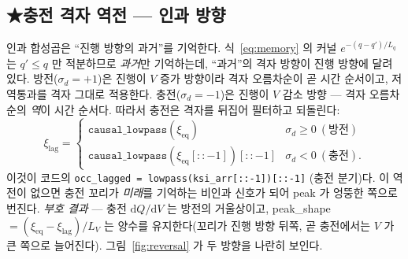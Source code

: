 \documentclass[11pt,a4paper]{article}
\newcommand{\dd}{\mathrm{d}}
\newcommand{\eq}{\mathrm{eq}}
\newcommand{\code}[1]{\texttt{#1}}
\begin{document}
\subsection{★충전 격자 역전 — 인과 방향}
인과 합성곱은 ``진행 방향의 과거''를 기억한다. 식~\eqref{eq:memory} 의 커널 $e^{-(q-q')/L_q}$ 는 $q'\le q$ 만 적분하므로
\emph{과거}만 기억하는데, ``과거''의 격자 방향이 진행 방향에 달려 있다. 방전($\sigma_d=+1$)은 진행이 $V$ 증가 방향이라
격자 오름차순이 곧 시간 순서이고, 저역통과를 격자 그대로 적용한다. 충전($\sigma_d=-1$)은 진행이 $V$ 감소 방향 —
격자 오름차순의 \emph{역}이 시간 순서다. 따라서 충전은 격자를 뒤집어 필터하고 되돌린다:
\begin{equation}
\xi_\mathrm{lag}=
\begin{cases}
\code{causal\_lowpass}(\xi_\eq) & \sigma_d\ge0\ (\text{방전})\\[2pt]
\code{causal\_lowpass}(\xi_\eq[::-1])[::-1] & \sigma_d<0\ (\text{충전}).
\end{cases}
\label{eq:reversal}
\end{equation}
이것이 코드의 \code{occ\_lagged = lowpass(ksi\_arr[::-1])[::-1]} (충전 분기)다. 이 역전이 없으면 충전 꼬리가
\emph{미래}를 기억하는 비인과 신호가 되어 peak 가 엉뚱한 쪽으로 번진다. \emph{부호 결과} — 충전 $\dd Q/\dd V$ 는 방전의
거울상이고, peak\_shape $=(\xi_\eq-\xi_\mathrm{lag})/L_V$ 는 양수를 유지한다(꼬리가 진행 방향 뒤쪽, 곧 충전에서는
$V$ 가 큰 쪽으로 늘어진다). 그림~\ref{fig:reversal} 가 두 방향을 나란히 보인다.
\end{document}

